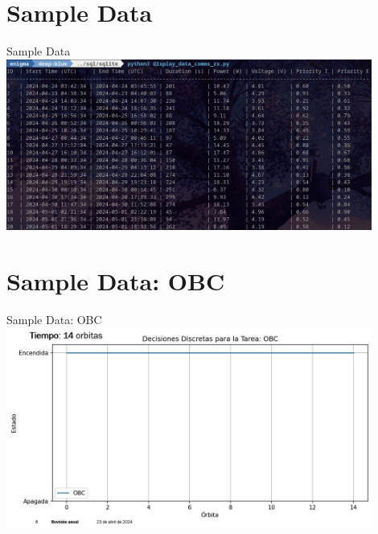 \documentclass[10pt]{beamer}
\begin{document}
\section{Sample Data}
\begin{frame}{Sample Data}
  \href{https://github.com/EnigmaK9/linx/tree/main/06-progress_04_22_2024/padilla-villanueva/sql}{\includegraphics[width=0.9\textwidth]{sample_data.jpeg}}

\end{frame}

\section{Sample Data: OBC}
\begin{frame}{Sample Data: OBC}
  \href{https://github.com/EnigmaK9/linx/tree/main/06-progress_04_22_2024/padilla-villanueva/sql}{\includegraphics[width=0.9\textwidth]{obc.jpeg}}

\end{frame}
\end{document}

